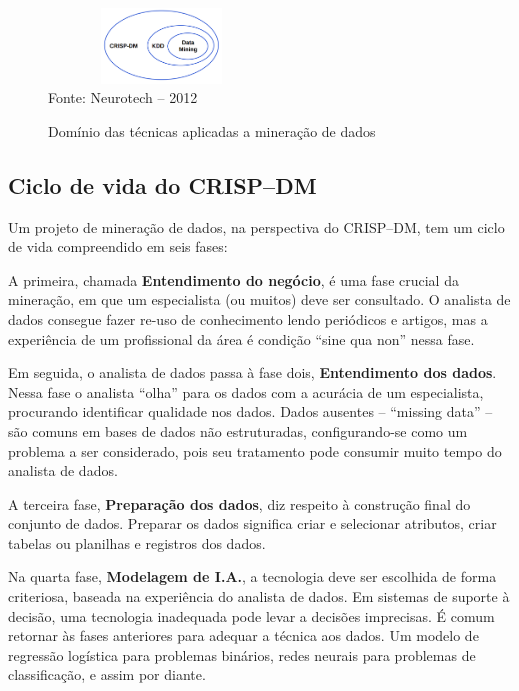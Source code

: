 \begin{figure}[!ht]
\centering
\caption{Domínio das técnicas aplicadas a mineração de dados}
\vspace{1mm}
\includegraphics[width=60mm, height=20mm]{Figuras/BigData/RelacaoCrispKddDm.png}\\
\tiny Fonte: Neurotech -- 2012
\end{figure}

\pagebreak

\subsection{Ciclo de vida do CRISP--DM}

Um projeto de mineração de dados, na perspectiva do CRISP--DM, tem um ciclo de vida compreendido em seis fases:

A primeira, chamada \textbf{Entendimento do negócio}, é uma fase crucial da mineração, em que um especialista (ou muitos) deve ser consultado. 
O analista de dados consegue fazer re-uso de conhecimento lendo periódicos e artigos, mas a experiência de um profissional da área 
é condição ``sine qua non'' nessa fase.

Em seguida, o analista de dados passa à fase dois, \textbf{Entendimento dos dados}. Nessa fase o analista ``olha'' para os dados com a acurácia de um especialista, 
procurando identificar qualidade nos dados. Dados ausentes -- ``missing data'' -- são comuns em bases de dados não estruturadas, configurando-se como
um problema a ser considerado, pois seu tratamento pode consumir muito tempo do analista de dados. 

A terceira fase, \textbf{Preparação dos dados}, diz respeito à construção final do conjunto de dados. 
Preparar os dados significa criar e selecionar atributos, criar tabelas ou planilhas e registros dos dados.

Na quarta fase, \textbf{Modelagem de I.A.}, a tecnologia deve ser escolhida de forma criteriosa, baseada na experiência do analista de dados. 
Em sistemas de suporte à decisão, uma tecnologia inadequada pode levar a decisões imprecisas. É comum retornar às fases anteriores para adequar a técnica aos dados. 
Um modelo de regressão logística para problemas binários, redes neurais para problemas de classificação, e assim por diante.

